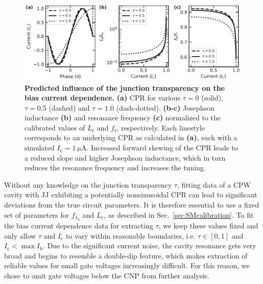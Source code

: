 \begin{figure}
	\centering
	\includegraphics[width=\linewidth]{chapter-gJJ-CPR/figs/SMFigure-influence}
	\caption{
		\textbf{Predicted influence of the junction transparency on the bias current dependence.}
		\textbf{(a)} CPR for various $\tau=0$ (solid), $\tau=0.5$ (dashed) and $\tau=1.0$	(dash-dotted).
		\textbf{(b-c)} Josephson inductance \textbf{(b)} and resonance frequency \textbf{(c)} normalized to the calibrated values of $L_\text{r}$ and $f_\text{r}$, respectively.
		Each linestyle corresponds to an underlying CPR as calculated in \textbf{(a)}, each with a simulated $I_\text{c}=\SI{1}{\micro\ampere}$.
		Increased forward skewing of the CPR leads to a reduced slope and higher Josephson inductance, which in turn reduces the resonance frequency and increases the tuning.
	}
	\label{CPRfig:SMinfluence}
\end{figure}

Without any knowledge on the junction transparency $\tau$, fitting data of a CPW cavity with JJ exhibiting a potentially nonsinusoidal CPR can lead to significant deviations from the true circuit parameters.
%
It is therefore essential to use a fixed set of parameters for $f_{\lambda_2}$ and $L_\text{r}$, as described in Sec.~\ref{sec:SMcalibration}.
%
To fit the bias current dependence data for extracting $\tau$, we keep these values fixed and only allow $\tau$ and $I_\text{c}$ to vary within reasonable boundaries, i.e. $\tau\in[0,1]$ and $I_\text{c}<\max I_\text{b}$.
%
Due to the significant current noise, the cavity resonance gets very broad and begins to resemble a double-dip feature, which makes extraction of reliable values for small gate voltages increasingly difficult.
%
For this reason, we chose to omit gate voltages below the CNP from further analysis.




